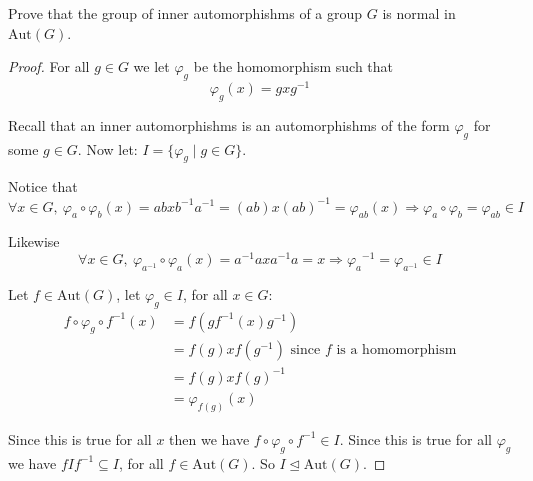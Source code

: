     \begin{exercise}
        Prove that the group of inner automorphishms of a group $G$ is normal in $\text{Aut}(G)$.
        \begin{proof}
            For all $g\in G$ we let $\varphi_g$ be the homomorphism such that \[\varphi_g(x) = gxg^{-1}\]

            Recall that an inner automorphishms is an automorphishms of the form $\varphi_g$ for some $g\in G$. Now let: $I = \{\varphi_g \mid g\in G\}$.

            Notice that \[\forall x\in G, \ \varphi_a\circ\varphi_b(x) = abxb^{-1}a^{-1} = (ab)x{(ab)}^{-1} = \varphi_{ab}(x)\Rightarrow \varphi_a\circ\varphi_b = \varphi_{ab}\in I \]

            Likewise \[\forall x\in G, \ \varphi_{a^{-1}}\circ\varphi_a(x) = a^{-1}axa^{-1}a = x\Rightarrow {\varphi_a}^{-1} = \varphi_{a^{-1}}\in I \]
        
        Let $f\in \text{Aut}(G)$, let $\varphi_g\in I$, for all $x\in G$:\begin{align*}
            f\circ\varphi_g\circ f^{-1}(x) &= f(gf^{-1}(x)g^{-1})\\
                                           &= f(g)xf(g^{-1}) \text{ since }f\text{ is a homomorphism}\\
                                           &= f(g)x{f(g)}^{-1}\\
                                           &= \varphi_{f(g)}(x)
        \end{align*}

        Since this is true for all $x$ then we have $f\circ\varphi_g\circ f^{-1} \in I$. Since this is true for all $\varphi_g$ we have $fIf^{-1} \subseteq I$, for all $f\in \text{Aut}(G)$. So $I\trianglelefteq \text{Aut}(G)$.


        \end{proof}
    \end{exercise}

